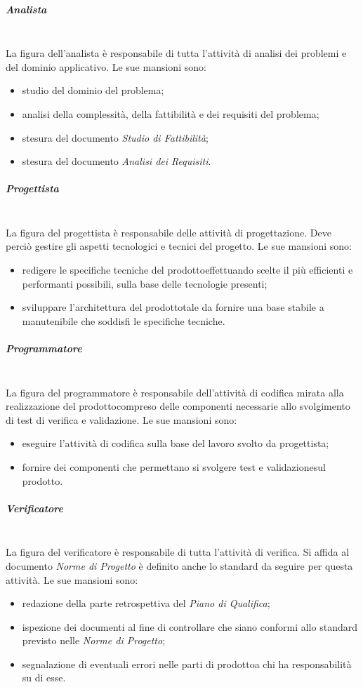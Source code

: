 			\subparagraph{Analista}\mbox{}\\ [1mm]
				La figura dell'analista è responsabile di tutta l'attività di analisi dei problemi e del dominio applicativo.
				Le sue mansioni sono:
				\begin{itemize}
					\item studio del dominio del problema;
					\item analisi della complessità, della fattibilità e dei requisiti del problema;
					\item stesura del documento \textit{Studio di Fattibilità};
					\item stesura del documento \textit{Analisi dei Requisiti}.
				\end{itemize}
			\subparagraph{Progettista}\mbox{}\\ [1mm]
				La figura del progettista è responsabile delle attività di progettazione\glo. Deve perciò gestire gli aspetti tecnologici e tecnici del progetto\glo.
				Le sue mansioni sono:
				\begin{itemize}
					\item redigere le specifiche tecniche del prodotto\glosp effettuando scelte il più efficienti e performanti possibili, sulla base delle tecnologie presenti;
					\item sviluppare l'architettura del prodotto\glosp tale da fornire una base stabile a manutenibile che soddisfi le specifiche tecniche.
				\end{itemize}
			\subparagraph{Programmatore}\mbox{}\\ [1mm]
				La figura del programmatore è responsabile dell'attività di codifica mirata alla realizzazione del prodotto\glosp compreso delle componenti necessarie allo svolgimento di test di verifica e validazione\glo.
				Le sue mansioni sono:
				\begin{itemize}
					\item eseguire l'attività di codifica sulla base del lavoro svolto da progettista;
					\item fornire dei componenti che permettano si svolgere test e validazione\glosp sul prodotto\glo.
				\end{itemize}
			\subparagraph{Verificatore}\mbox{}\\ [1mm]
				La figura del verificatore è responsabile di tutta l'attività di verifica.
				Si affida al documento \textit{Norme di Progetto} è definito anche lo standard da seguire per questa attività.
				Le sue mansioni sono:
				\begin{itemize}
					\item redazione della parte retrospettiva del \textit{Piano di Qualifica};
					\item ispezione dei documenti al fine di controllare che siano conformi allo standard previsto nelle \textit{Norme di Progetto};
					\item segnalazione di eventuali errori nelle parti di prodotto\glosp a chi ha responsabilità su di esse.
				\end{itemize}
